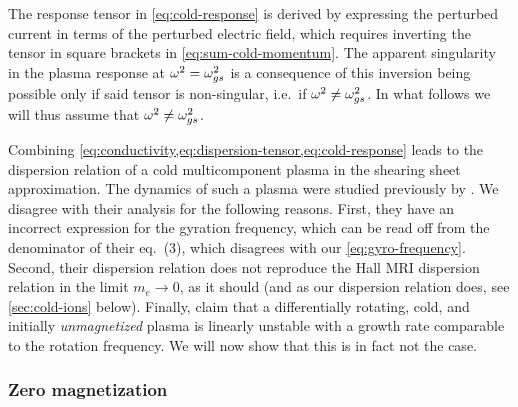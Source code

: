 \documentclass[aps,pre,notitlepage,amsmath,amssymb,amsfonts,nobibnotes,nofootinbib,superscriptaddress]{revtex4-1}
\begin{document}
The response tensor in \cref{eq:cold-response} is derived by expressing the
perturbed current in terms of the perturbed electric field, which requires
inverting  the tensor in square brackets in \cref{eq:sum-cold-momentum}. The
apparent singularity in the plasma response at $\omega^2=\omega_{gs}^2$ is a
consequence of this inversion being possible only if said tensor is
non-singular, i.e.\ if $\omega^2\ne\omega_{gs}^2$. In what follows we will thus
assume that $\omega^2\ne\omega_{gs}^2$. 

Combining \cref{eq:conductivity,eq:dispersion-tensor,eq:cold-response} leads
to the dispersion relation of a cold multicomponent plasma in the shearing
sheet approximation. The dynamics of such a plasma were studied previously by
\citet{Krolik2006}. We disagree with their analysis for the following reasons.
First, they have an incorrect expression for the gyration
frequency, which can be read off from the denominator of their eq.~(3), which
disagrees with our \cref{eq:gyro-frequency}. Second, their dispersion relation
does not reproduce the Hall MRI dispersion relation
\citep{Wardle1999,Balbus2001} in the limit $m_e\to0$, as it should (and as our
dispersion relation does, see \cref{sec:cold-ions} below). Finally,
\citet{Krolik2006} claim that a differentially rotating, cold, and initially
\emph{unmagnetized} plasma is linearly unstable with a growth rate comparable
to the rotation frequency. We will now show that this is in fact not the case.

\subsubsection{Zero magnetization}
\label{sec:zero-mag}
\end{document}
